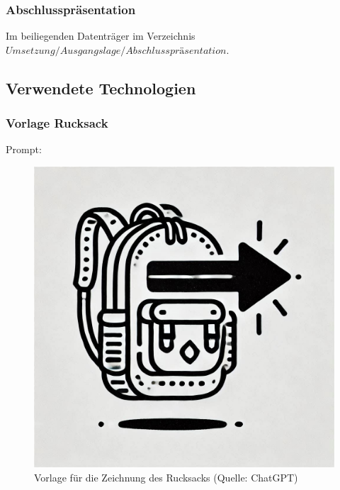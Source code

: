 \documentclass[
	12pt,
	a4paper,
	bibtotoc,
	cleardoubleempty, 
	idxtotoc,
	ngerman,
	openright
	final,
	listof=nochaptergap,
	]{scrbook}
\begin{document}
\begin{appendices}
\subsubsection{Abschlusspräsentation}\label{sec:append_realisation_ausgangslage_presentation}
Im beiliegenden Datenträger im Verzeichnis $Umsetzung/Ausgangslage/Abschlusspräsentation$.

\subsection{Verwendete Technologien}

\subsubsection{Vorlage Rucksack}\label{sec:append_realisation_vorlage_rucksack}

Prompt: 

\begin{figure}[ht]
\centering
\includegraphics[width=1\linewidth]{content/attachments/vorlagen/Vorlage_Rucksack.png}
\caption{Vorlage für die Zeichnung des Rucksacks (Quelle: ChatGPT)}
\label{fig:vorlage_rucksack}
\end{figure}
\clearpage


\end{appendices}
\end{document}
